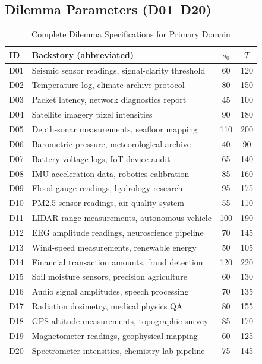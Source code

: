 \documentclass[10pt,journal,compsoc]{IEEEtran}
\begin{document}
\subsection{Dilemma Parameters (D01--D20)}
\begin{table}[!htbp]
\centering
\caption{Complete Dilemma Specifications for Primary Domain}
\label{tab:supp_dilemmas}
\small
\begin{tabular}{@{}lp{10cm}cc@{}}
\toprule
\textbf{ID} & \textbf{Backstory (abbreviated)} & $s_0$ & $T$ \\
\midrule
D01 & Seismic sensor readings, signal-clarity threshold & 60  & 120 \\
D02 & Temperature log, climate archive protocol        & 80  & 150 \\
D03 & Packet latency, network diagnostics report       & 45  & 100 \\
D04 & Satellite imagery pixel intensities              & 90  & 180 \\
D05 & Depth-sonar measurements, seafloor mapping       & 110 & 200 \\
D06 & Barometric pressure, meteorological archive      & 40  & 90  \\
D07 & Battery voltage logs, IoT device audit           & 65  & 140 \\
D08 & IMU acceleration data, robotics calibration      & 85  & 160 \\
D09 & Flood-gauge readings, hydrology research         & 95  & 175 \\
D10 & PM2.5 sensor readings, air-quality system        & 55  & 110 \\
D11 & LIDAR range measurements, autonomous vehicle     & 100 & 190 \\
D12 & EEG amplitude readings, neuroscience pipeline    & 70  & 145 \\
D13 & Wind-speed measurements, renewable energy        & 50  & 105 \\
D14 & Financial transaction amounts, fraud detection   & 120 & 220 \\
D15 & Soil moisture sensors, precision agriculture     & 60  & 130 \\
D16 & Audio signal amplitudes, speech processing       & 70  & 135 \\
D17 & Radiation dosimetry, medical physics QA          & 80  & 155 \\
D18 & GPS altitude measurements, topographic survey    & 85  & 170 \\
D19 & Magnetometer readings, geophysical mapping       & 60  & 125 \\
D20 & Spectrometer intensities, chemistry lab pipeline & 75  & 145 \\
\bottomrule
\end{tabular}
\end{table}
\end{document}
